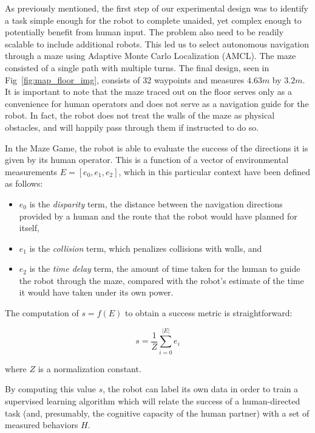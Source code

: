 \documentclass{sig-alternate}
\begin{document}
As previously mentioned, the first step of our experimental design was
to identify a task simple enough for the robot to complete unaided,
yet complex enough to potentially benefit from human input. The
problem also need to be readily scalable to include additional
robots. This led us to select autonomous navigation through a maze
using Adaptive Monte Carlo Localization (AMCL). The maze consisted of
a single path with multiple  turns.  The final
design, seen in Fig~\ref{fig:map_floor_img}, consists of 32 waypoints
and measures $4.63m$ by $3.2m$. It is important to note that the maze
traced out on the floor serves only as a convenience for human
operators and does not serve as a navigation guide for the robot. In
fact, the robot does not treat the walls of the maze as physical
obstacles, and will happily pass through them if instructed to do so.

In the Maze Game, the robot is able to evaluate the success of the
directions it is given by its human operator.  This is a function of a
vector of environmental measurements $E = [e_0, e_1, e_2]$, which in
this particular context have been defined as follows:

\begin{itemize}
\item $e_0$ is the \emph{disparity} term, the distance between the
  navigation directions provided by a human and the route that the
  robot would have planned for itself,
\item $e_1$ is the \emph{collision} term, which penalizes collisions
  with walls, and
\item $e_2$ is the \emph{time delay} term, the amount of time taken
  for the human to guide the robot through the maze, compared with the
  robot's estimate of the time it would have taken under its own power.
\end{itemize}

The computation of $s = f(E)$ to obtain a success metric is
straightforward:

\begin{equation}
s = \frac{1}{Z}\sum_{i=0}^{|E|} e_i
\end{equation}

where $Z$ is a normalization constant.


By computing this value $s$, the robot can label its own data in order
to train a supervised learning algorithm which will relate the success
of a human-directed task (and, presumably, the cognitive capacity of
the human partner) with a set of measured behaviors $H$.
\end{document}
